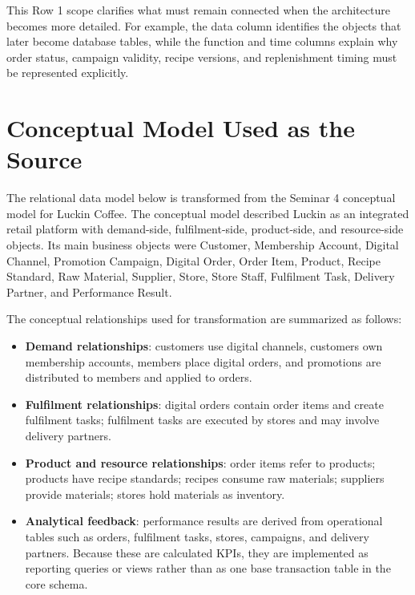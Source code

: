 \documentclass[12pt,a4paper]{article}
\begin{document}
This Row 1 scope clarifies what must remain connected when the architecture becomes more detailed. For example, the data column identifies the objects that later become database tables, while the function and time columns explain why order status, campaign validity, recipe versions, and replenishment timing must be represented explicitly.

\section{Conceptual Model Used as the Source}

The relational data model below is transformed from the Seminar 4 conceptual model for Luckin Coffee. The conceptual model described Luckin as an integrated retail platform with demand-side, fulfilment-side, product-side, and resource-side objects. Its main business objects were Customer, Membership Account, Digital Channel, Promotion Campaign, Digital Order, Order Item, Product, Recipe Standard, Raw Material, Supplier, Store, Store Staff, Fulfilment Task, Delivery Partner, and Performance Result.

The conceptual relationships used for transformation are summarized as follows:
\begin{itemize}[leftmargin=1.3em]
  \item \textbf{Demand relationships}: customers use digital channels, customers own membership accounts, members place digital orders, and promotions are distributed to members and applied to orders.
  \item \textbf{Fulfilment relationships}: digital orders contain order items and create fulfilment tasks; fulfilment tasks are executed by stores and may involve delivery partners.
  \item \textbf{Product and resource relationships}: order items refer to products; products have recipe standards; recipes consume raw materials; suppliers provide materials; stores hold materials as inventory.
  \item \textbf{Analytical feedback}: performance results are derived from operational tables such as orders, fulfilment tasks, stores, campaigns, and delivery partners. Because these are calculated KPIs, they are implemented as reporting queries or views rather than as one base transaction table in the core schema.
\end{itemize}

\end{document}
